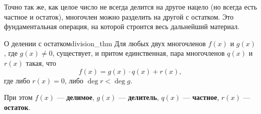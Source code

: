 \documentclass[12pt,a4paper]{article}
\begin{document}
Точно так же, как целое число не всегда делится на другое нацело
(но всегда есть частное и остаток), многочлен можно разделить на
другой с остатком. Это фундаментальная операция, на которой строится
весь дальнейший материал.

\begin{theorem}{О делении с остатком}{division_thm}
  Для любых двух многочленов $f(x)$ и $g(x)$, где $g(x) \neq 0$,
  существует, и притом единственная, пара многочленов $q(x)$ и $r(x)$
  такая, что
  \begin{equation}
    f(x) = g(x) \cdot q(x) + r(x), \label{eq:division}
  \end{equation}
  где либо $r(x) = 0$, либо $\deg r < \deg g$.

  При этом $f(x)$ — \textbf{делимое}, $g(x)$ — \textbf{делитель},
  $q(x)$ — \textbf{частное}, $r(x)$ — \textbf{остаток}.
\end{theorem}
\end{document}
